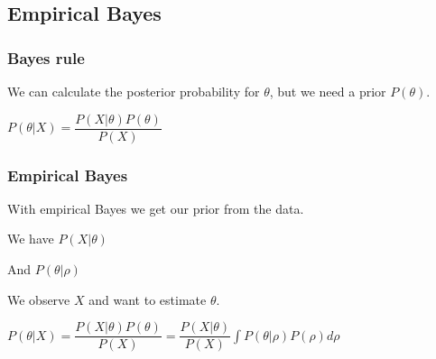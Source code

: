
\subsection{Empirical Bayes}

\subsubsection{Bayes rule}

We can calculate the posterior probability for \(\theta \), but we need a prior \(P(\theta )\).

\(P(\theta | X)=\dfrac{P(X|\theta )P(\theta )}{P(X)}\)

\subsubsection{Empirical Bayes}

With empirical Bayes we get our prior from the data.

We have \(P(X|\theta )\)

And \(P(\theta |\rho )\)

We observe \(X\) and want to estimate \(\theta \).

\(P(\theta |X)=\dfrac{P(X|\theta)P(\theta )}{P(X)}=\dfrac{P(X|\theta)}{P(X)}\int P(\theta | \rho )P(\rho )d\rho \)

